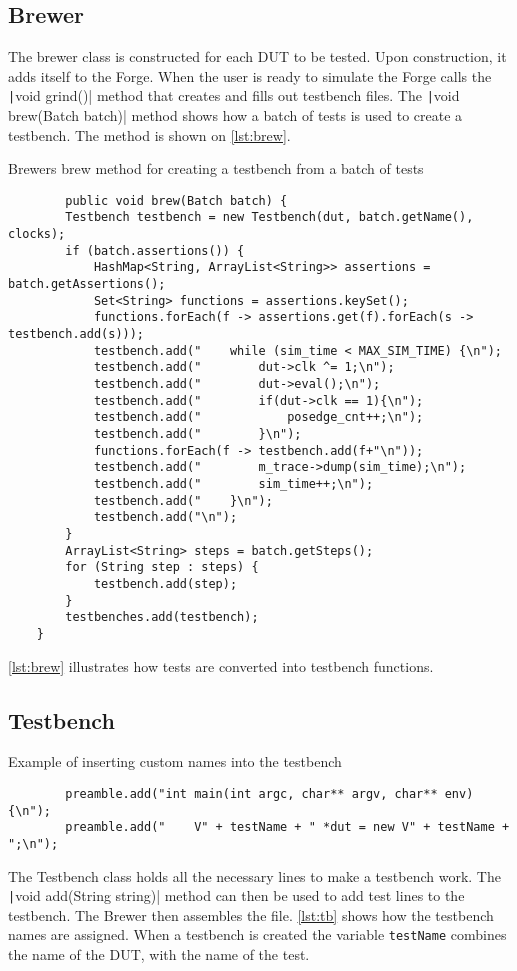\subsection{Brewer}
The brewer class is constructed for each DUT to be tested. Upon construction, it adds itself to the Forge.\newline
When the user is ready to simulate the Forge calls the \texttt|void grind()| method that creates and fills out testbench files. The \texttt|void brew(Batch batch)| method shows how a batch of tests is used to create a testbench. The method is shown on \cref{lst:brew}.
\begin{listing}
    \centering
    \caption{Brewers brew method for creating a testbench from a batch of tests}\label{lst:brew}
    \begin{verbatim}
        public void brew(Batch batch) {
        Testbench testbench = new Testbench(dut, batch.getName(), clocks);
        if (batch.assertions()) {
            HashMap<String, ArrayList<String>> assertions = batch.getAssertions();
            Set<String> functions = assertions.keySet();
            functions.forEach(f -> assertions.get(f).forEach(s -> testbench.add(s)));
            testbench.add("    while (sim_time < MAX_SIM_TIME) {\n");
            testbench.add("        dut->clk ^= 1;\n");
            testbench.add("        dut->eval();\n");
            testbench.add("        if(dut->clk == 1){\n");
            testbench.add("            posedge_cnt++;\n");
            testbench.add("        }\n");
            functions.forEach(f -> testbench.add(f+"\n"));
            testbench.add("        m_trace->dump(sim_time);\n");
            testbench.add("        sim_time++;\n");
            testbench.add("    }\n");
            testbench.add("\n");
        }
        ArrayList<String> steps = batch.getSteps();
        for (String step : steps) {
            testbench.add(step);
        }
        testbenches.add(testbench);
    }
    \end{verbatim}
\end{listing}
\cref{lst:brew} illustrates how tests are converted into testbench functions.
\subsection{Testbench}
\begin{listing}
    \centering
    \caption{Example of inserting custom names into the testbench}\label{lst:tb}
    \begin{verbatim}
        preamble.add("int main(int argc, char** argv, char** env) {\n");
        preamble.add("    V" + testName + " *dut = new V" + testName + ";\n");
    \end{verbatim}
\end{listing}
The Testbench class holds all the necessary lines to make a testbench work. The \texttt|void add(String string)| method can then be used to add test lines to the testbench. The Brewer then assembles the file. \cref{lst:tb} shows how the testbench names are assigned. When a testbench is created the variable \texttt{testName} combines the name of the DUT, with the name of the test.
